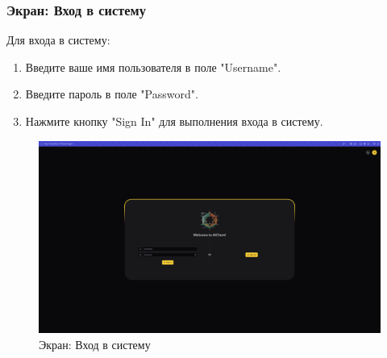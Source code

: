 \documentclass[a4paper,12pt,reqno]{article}
\begin{document}
\subsubsection{Экран: Вход в систему}
Для входа в систему:
\begin{enumerate}
    \item Введите ваше имя пользователя в поле "Username".
    \item Введите пароль в поле "Password".
    \item Нажмите кнопку "Sign In" для выполнения входа в систему.
\end{enumerate}
\begin{figure}[H]
    \centering
    \includegraphics[width=\textwidth]{RO/img/signin.png} %
    \caption{Экран: Вход в систему}
    \label{fig:signin}
\end{figure}
\end{document}

